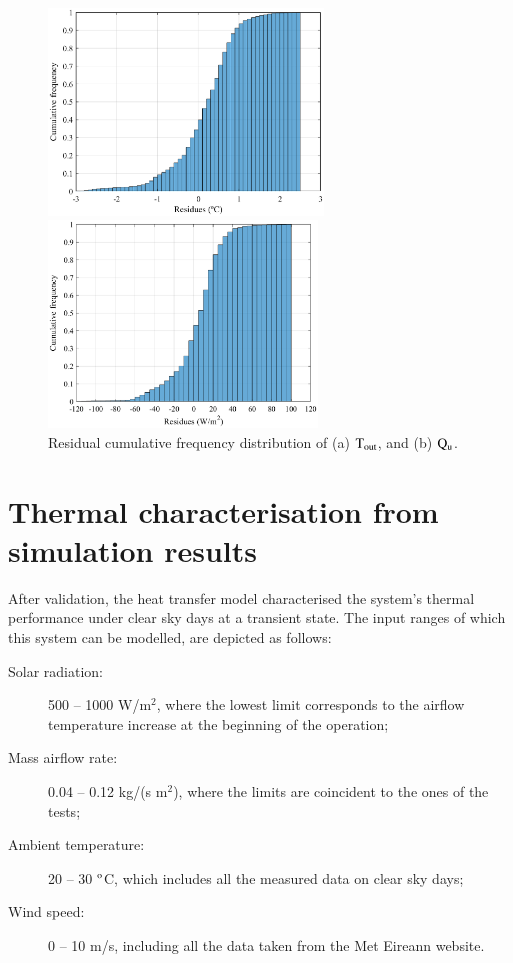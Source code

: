 \begin{figure}[ht!]
	\begin{minipage}{0.49\columnwidth}
		\includegraphics[width=0.95\columnwidth,height=5.5cm]{figs/cdf_T.eps}
	\end{minipage}
	\begin{minipage}{0.49\columnwidth}
		\includegraphics[width=1.0\columnwidth,height=5.5cm]{figs/cdf_Q.eps}
	\end{minipage}
	\caption{Residual cumulative frequency distribution of (a) $\rm{T_{out}}$, and (b) $\rm{Q_u}$.}
	\label{cdf}
\end{figure}


\section{Thermal characterisation from simulation results}

After validation, the heat transfer model characterised the system's thermal performance under clear sky days at a transient state. The input ranges of which this system can be modelled, are depicted as follows:

\begin{description}
	\item[Solar radiation:] 500 -- 1000 W/m$^2$, where the lowest limit corresponds to the airflow temperature increase at the beginning of the operation;
	\item[Mass airflow rate:] 0.04 -- 0.12 kg/(s m$^2$), where the limits are coincident to the ones of the tests;
	\item[Ambient temperature:] 20 -- 30 $^{\rm{o}}$C, which includes all the measured data on clear sky days;
	\item[Wind speed:] 0 -- 10 m/s, including all the data taken from the Met Eireann website.
\end{description}


